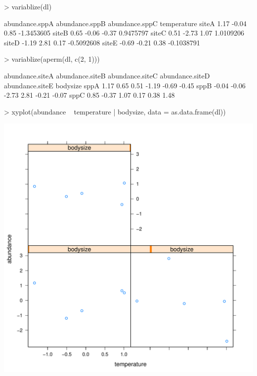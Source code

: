 \documentclass{article}
\numberwithin{exercise}{section}
\begin{document}
\begin{Schunk}
\begin{Sinput}
> variablize(dl)
\end{Sinput}
\begin{Soutput}
      abundance.sppA abundance.sppB abundance.sppC temperature
siteA           1.17          -0.04           0.85  -1.3453605
siteB           0.65          -0.06          -0.37   0.9475797
siteC           0.51          -2.73           1.07   1.0109206
siteD          -1.19           2.81           0.17  -0.5092608
siteE          -0.69          -0.21           0.38  -0.1038791
\end{Soutput}
\end{Schunk}

\newpage

\begin{Schunk}
\begin{Sinput}
> variablize(aperm(dl, c(2, 1)))
\end{Sinput}
\begin{Soutput}
     abundance.siteA abundance.siteB abundance.siteC abundance.siteD abundance.siteE bodysize
sppA            1.17            0.65            0.51           -1.19           -0.69    -0.45
sppB           -0.04           -0.06           -2.73            2.81           -0.21    -0.07
sppC            0.85           -0.37            1.07            0.17            0.38     1.48
\end{Soutput}
\end{Schunk}

\newpage

\begin{Schunk}
\begin{Sinput}
> xyplot(abundance ~ temperature | bodysize, data = as.data.frame(dl))
\end{Sinput}
\end{Schunk}
\includegraphics{sweave-019}
\end{document}

